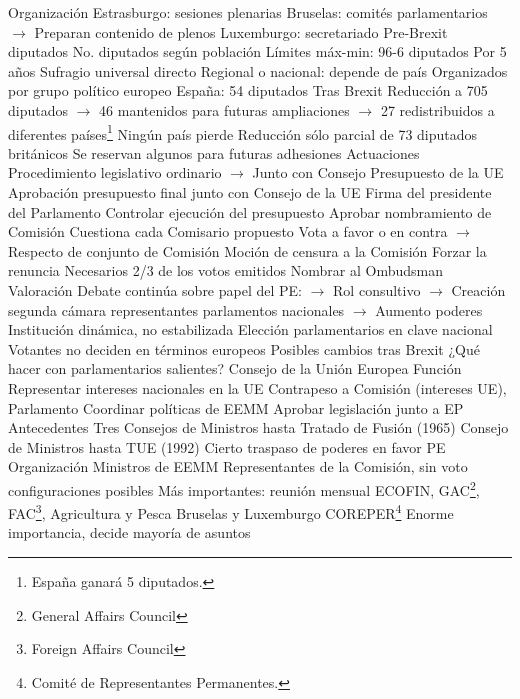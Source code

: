 \documentclass{nuevotema}
\begin{document}
\begin{esquemal}
			\3 Organización
				\4 Estrasburgo: sesiones plenarias
				\4 Bruselas: comités parlamentarios
				\4[] $\to$ Preparan contenido de plenos
				\4 Luxemburgo: secretariado
				\4 Pre-Brexit
				\4[] 751 diputados
				\4[] No. diputados según población
				\4[] Límites máx-min: 96-6 diputados
				\4[] Por 5 años
				\4[] Sufragio universal directo
				\4[] Regional o nacional: depende de país
				\4[] Organizados por grupo político europeo
				\4[] España: 54 diputados
				\4 Tras Brexit
				\4[] Reducción a 705 diputados
				\4[] $\to$ 46 mantenidos para futuras ampliaciones
				\4[] $\to$ 27 redistribuidos a diferentes países\footnote{España ganará 5 diputados.}
				\4[] Ningún país pierde
				\4[] Reducción sólo parcial de 73 diputados británicos
				\4[] Se reservan algunos para futuras adhesiones
			\3 Actuaciones
				\4 Procedimiento legislativo ordinario
				\4[] $\to$ Junto con Consejo
				\4 Presupuesto de la UE
				\4[] Aprobación presupuesto final junto con Consejo de la UE
				\4[] Firma del presidente del Parlamento
				\4 Controlar ejecución del presupuesto
				\4 Aprobar nombramiento de Comisión
				\4[] Cuestiona cada Comisario propuesto
				\4[] Vota a favor o en contra
				\4[] $\to$ Respecto de conjunto de Comisión
				\4 Moción de censura a la Comisión
				\4[] Forzar la renuncia
				\4[] Necesarios 2/3 de los votos emitidos
				\4 Nombrar al Ombudsman
			\3 Valoración
				\4 Debate continúa sobre papel del PE:
				\4[] $\to$ Rol consultivo
				\4[] $\to$ Creación segunda cámara representantes parlamentos nacionales
				\4[] $\to$ Aumento poderes
				\4 Institución dinámica, no estabilizada
				\4 Elección parlamentarios en clave nacional
				\4 Votantes no deciden en términos europeos
				\4 Posibles cambios tras Brexit
				\4[] ¿Qué hacer con parlamentarios salientes?
		\2 Consejo de la Unión Europea
			\3 Función
				\4 Representar intereses nacionales en la UE
				\4 Contrapeso a Comisión (intereses UE), Parlamento
				\4 Coordinar políticas de EEMM
				\4 Aprobar legislación junto a EP
			\3 Antecedentes
				\4 Tres Consejos de Ministros hasta Tratado de Fusión (1965)
				\4 Consejo de Ministros hasta TUE (1992)
				\4 Cierto traspaso de poderes en favor PE
			\3 Organización
				\4 Ministros de EEMM
				\4 Representantes de la Comisión, sin voto
				 configuraciones posibles
				\4 Más importantes: reunión mensual
				\4[] ECOFIN, GAC\footnote{General Affairs Council}, FAC\footnote{Foreign Affairs Council}, Agricultura y Pesca
				\4 Bruselas y Luxemburgo
				\4 COREPER\footnote{Comité de Representantes Permanentes.}
				\4[] Enorme importancia, decide mayoría de asuntos

\end{esquemal}
\end{document}
